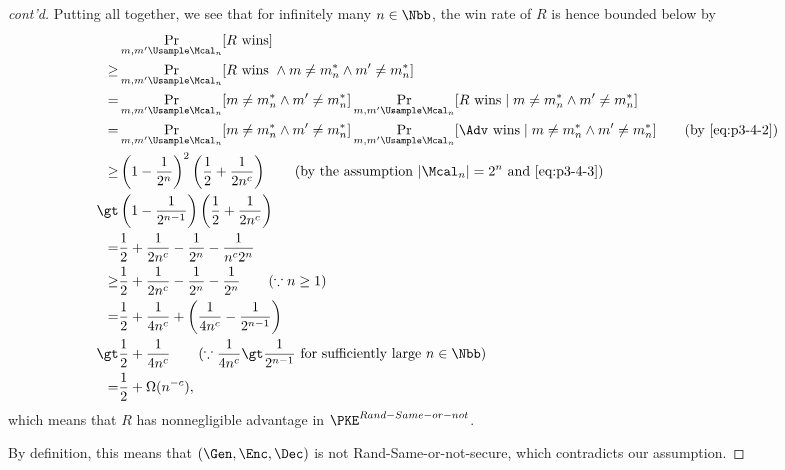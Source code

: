 \begin{answer}[iv]
\begin{proof}[cont'd]
            
        Putting all together, we see that for infinitely many $n\in\Nbb$, the win rate of $R$ is hence bounded below by
        \begin{align*}
            &\Pr_{m,m'\Usample\Mcal_n}[R \textrm{ wins}]\\
            \ge& \Pr_{m,m'\Usample\Mcal_n}[R \textrm{ wins } \land m\neq m^\ast_n\land m'\neq m^\ast_n]\\
            =&\Pr_{m,m'\Usample\Mcal_n}[ m\neq m^\ast_n\land m'\neq m^\ast_n] \Pr_{m,m'\Usample\Mcal_n}[R \textrm{ wins} \mid m\neq m^\ast_n\land m'\neq m^\ast_n]\\
            =&\Pr_{m,m'\Usample\Mcal_n}[ m\neq m^\ast_n\land m'\neq m^\ast_n] \Pr_{m,m'\Usample\Mcal_n}[\Adv \textrm{ wins} \mid m\neq m^\ast_n\land m'\neq m^\ast_n]
            \qquad (\textrm{by \eqref{eq:p3-4-2}})\\
            \ge& \left(1-\frac{1}{2^n}\right)^2 \left(\frac{1}{2}+\frac{1}{2n^c}\right)
            \qquad (\textrm{by the assumption } |\Mcal_n|=2^n \textrm{ and \eqref{eq:p3-4-3}})\\
            \gt& \left(1-\frac{1}{2^{n-1}}\right) \left(\frac{1}{2}+\frac{1}{2n^c}\right)\\
            =& \frac{1}{2}+\frac{1}{2n^c}-\frac{1}{2^n}-\frac{1}{n^c2^n}\\
            \ge& \frac{1}{2}+\frac{1}{2n^c}-\frac{1}{2^n}-\frac{1}{2^n} \qquad (\because n\ge 1)\\
            =& \frac{1}{2}+\frac{1}{4n^c}+\left(\frac{1}{4n^c}-\frac{1}{2^{n-1}}\right)\\
            \gt& \frac{1}{2}+\frac{1}{4n^c}\qquad (\because \frac{1}{4n^c} \gt \frac{1}{2^{n-1}} \textrm{ for sufficiently large } n\in\Nbb)\\
            =& \frac{1}{2}+\Omega(n^{-c}),
        \end{align*}
        which means that $R$ has nonnegligible advantage in $\PKE^{Rand-Same-or-not}$.

        By definition, this means that $(\Gen, \Enc, \Dec)$ is not Rand-Same-or-not-secure, which contradicts our assumption.
    \end{proof}






\end{answer}
